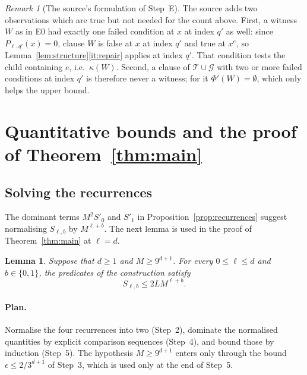 \documentclass[11pt]{article}
\newtheorem{lemma}[theorem]{Lemma}
\theoremstyle{definition}
\theoremstyle{remark}
\newtheorem{remark}[theorem]{Remark}
\begin{document}
\begin{remark}[The source's formulation of Step~E]
The source adds two observations which are true but not needed for the
count above. First, a witness \(W\) as in E0 had exactly one failed
condition at \(x\) at index \(q'\) as well: since \(P_{\ell,q'}(x)=0\),
clause \(W\) is false at \(x\) at index \(q'\) and true at \(x^e\), so
Lemma~\ref{lem:structure}\ref{it:repair} applies at index \(q'\). That
condition tests the child containing \(e\), i.e.\ \(\kappa(W)\). Second, a
clause of \(\mathcal T\cup\mathcal G\) with two or more failed conditions at
index \(q'\) is therefore never a witness; for it \(\Phi'(W)=\emptyset\),
which only helps the upper bound.
\end{remark}

\section{Quantitative bounds and the proof of Theorem~\ref{thm:main}}
\label{sec:separation}

\subsection{Solving the recurrences}

The dominant terms \(M^2S'_0\) and \(S'_1\) in
Proposition~\ref{prop:recurrences} suggest normalising \(S_{\ell,b}\) by
\(M^{\ell+b}\). The next lemma is used in the proof of
Theorem~\ref{thm:main} at \(\ell=d\).

\begin{lemma}
\label{lem:quantitative-profiles}
Suppose that \(d\geq 1\) and \(M\geq 9^{d+1}\).
For every \(0\leq\ell\leq d\) and \(b\in\{0,1\}\), the predicates of the
construction satisfy
\[
  S_{\ell,b}\leq 2L M^{\ell+b}.
\]
\end{lemma}

\paragraph{Plan.}
Normalise the four recurrences into two (Step~2), dominate the normalised
quantities by explicit comparison sequences (Step~4), and bound those by
induction (Step~5). The hypothesis \(M\ge9^{d+1}\) enters only through the
bound \(\epsilon\le2/3^{d+1}\) of Step~3, which is used only at the end of
Step~5.
\end{document}
